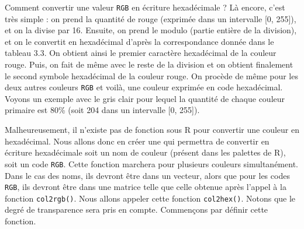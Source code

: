 \documentclass[]{article}
\newenvironment{Shaded}{\begin{snugshade}}{\end{snugshade}}
\newcommand{\CommentTok}[1]{\textcolor[rgb]{0.56,0.35,0.01}{\textit{#1}}}
\newcommand{\DecValTok}[1]{\textcolor[rgb]{0.00,0.00,0.81}{#1}}
\newcommand{\KeywordTok}[1]{\textcolor[rgb]{0.13,0.29,0.53}{\textbf{#1}}}
\newcommand{\NormalTok}[1]{#1}
\newcommand{\OperatorTok}[1]{\textcolor[rgb]{0.81,0.36,0.00}{\textbf{#1}}}
\newcommand{\StringTok}[1]{\textcolor[rgb]{0.31,0.60,0.02}{#1}}
\begin{document}
Comment convertir une valeur \texttt{RGB} en écriture hexadécimale ? Là encore, c'est très simple : on prend la quantité de rouge (exprimée dans un intervalle {[}0, 255{]}), et on la divise par 16. Ensuite, on prend le modulo (partie entière de la division), et on le convertit en hexadécimal d'après la correspondance donnée dans le tableau 3.3. On obtient ainsi le premier caractère hexadécimal de la couleur rouge. Puis, on fait de même avec le reste de la division et on obtient finalement le second symbole hexadécimal de la couleur rouge. On procède de même pour les deux autres couleurs \texttt{RGB} et voilà, une couleur exprimée en code hexadécimal.
Voyons un exemple avec le gris clair pour lequel la quantité de chaque couleur primaire est 80\% (soit 204 dans un intervalle {[}0, 255{]}).

\begin{Shaded}
\end{Shaded}

Malheureusement, il n'existe pas de fonction sous R pour convertir une couleur en hexadécimal. Nous allons donc en créer une qui permettra de convertir en écriture hexadécimale soit un nom de couleur (présent dans les palettes de R), soit un code \texttt{RGB}. Cette fonction marchera pour plusieurs couleurs simultanément. Dans le cas des noms, ils devront être dans un vecteur, alors que pour les codes \texttt{RGB}, ils devront être dans une matrice telle que celle obtenue après l'appel à la fonction \texttt{col2rgb()}. Nous allons appeler cette fonction \texttt{col2hex()}. Notons que le degré de transparence sera pris en compte. Commençons par définir cette fonction.
\end{document}
